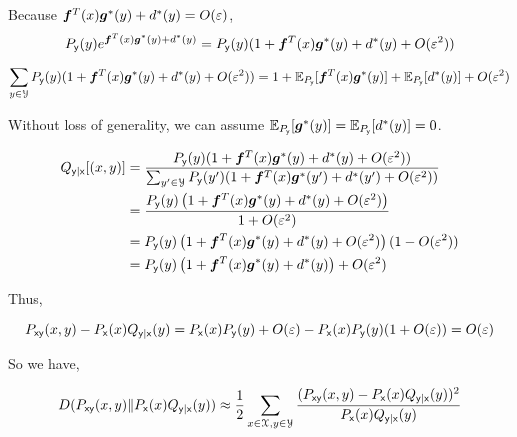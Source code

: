 \documentclass[a4paper]{article}
\begin{document}
\begin{enumerate}
\begin{enumerate}
    Because $\boldsymbol{f}^T(x) \boldsymbol{g}^*(y) + d^*(y) = O(\varepsilon)$, 
    \begin{equation}
      P_{\mathsf{y}}(y) e^{\boldsymbol{f}^T(x) \boldsymbol{g}^*(y) + d^*(y)} =  P_{\mathsf{y}}(y) (1+ \boldsymbol{f}^T(x) \boldsymbol{g}^*(y) + d^*(y) + O(\varepsilon^2))
    \end{equation}

    \begin{equation}
      \begin{aligned}
        \sum_{y \in \mathcal{Y}}  P_{\mathsf{y}}(y) (1+ \boldsymbol{f}^T(x) \boldsymbol{g}^*(y) + d^*(y) + O(\varepsilon^2)) = 1 + \operatorname{\mathbb{E}}_{P_{\mathsf{y}}} [\boldsymbol{f}^T(x) \boldsymbol{g}^*(y)] + \operatorname{\mathbb{E}}_{P_{\mathsf{y}}} [d^*(y)]  + O(\varepsilon^2)
      \end{aligned}
    \end{equation}

    Without loss of generality, we can assume $\operatorname{\mathbb{E}}_{P_{\mathsf{y}}} [\boldsymbol{g}^*(y)] = \operatorname{\mathbb{E}}_{P_{\mathsf{y}}} [d^*(y)] = 0$.


    \begin{equation}
      \begin{aligned}
        Q_{\mathsf{y} | \mathsf{x}}[(x,y)] & = \frac{P_{\mathsf{y}}(y) (1+ \boldsymbol{f}^T(x) \boldsymbol{g}^*(y) + d^*(y) + O(\varepsilon^2))}{ \sum_{y' \in \mathcal{Y}}  P_{\mathsf{y}}(y') (1+ \boldsymbol{f}^T(x) \boldsymbol{g}^*(y') + d^*(y') + O(\varepsilon^2))} \\
        & = \frac{ P_{\mathsf{y}}(y) \left(1+ \boldsymbol{f}^T(x) \boldsymbol{g}^*(y) + d^*(y) + O(\varepsilon^2)\right)}{1+ O(\varepsilon^2)} \\
        & = P_{\mathsf{y}}(y) \left(1+ \boldsymbol{f}^T(x) \boldsymbol{g}^*(y) + d^*(y) + O(\varepsilon^2)\right)(1-O(\varepsilon^2)) \\
        & = P_{\mathsf{y}}(y) \left(1+ \boldsymbol{f}^T(x) \boldsymbol{g}^*(y) + d^*(y)\right) + O(\varepsilon^2)
      \end{aligned}
    \end{equation}

    Thus,

    \begin{equation}
      P_{\mathsf{x}\mathsf{y}}(x,y) - P_{\mathsf{x}}(x)Q_{\mathsf{y}|\mathsf{x}}(y) = P_{\mathsf{x}}(x) P_{\mathsf{y}}(y) + O(\varepsilon) -P_{\mathsf{x}}(x)P_{\mathsf{y}}(y)(1+O(\varepsilon))  = O(\varepsilon)
    \end{equation}

    So we have,

    \begin{equation}
      D(P_{\mathsf{x}\mathsf{y}}(x,y) \| P_{\mathsf{x}}(x)Q_{\mathsf{y}|\mathsf{x}}(y) ) \approx \frac{1}{2} \sum_{x\in \mathcal{X},y\in \mathcal{Y}} \frac{(P_{\mathsf{x}\mathsf{y}}(x,y) - P_{\mathsf{x}}(x)Q_{\mathsf{y}|\mathsf{x}}(y))^2}{P_{\mathsf{x}}(x)Q_{\mathsf{y}|\mathsf{x}}(y)}
    \end{equation}
  \end{enumerate}


  \end{enumerate}
\end{document}
